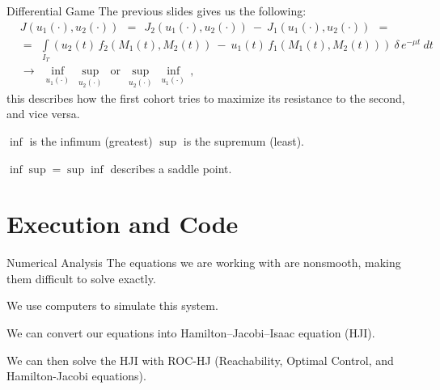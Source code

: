 \documentclass{beamer}
\begin{document}
\begin{frame}{Differential Game}
    The previous slides gives us the following:
    $$
    \begin{aligned}
    & J(u_1(\cdot), u_2(\cdot)) \:\: = \:\: J_2(u_1(\cdot), u_2(\cdot)) \: - \: J_1(u_1(\cdot), u_2(\cdot)) \:\: = \\
    & = \:\: \int\limits_{I_T} (u_2(t) \, f_2(M_1(t), M_2(t)) \: - \: u_1(t) \, f_1(M_1(t), M_2(t))) \: \delta \, e^{-\mu t} \: dt \:\:
    \\& \longrightarrow \:\: \inf_{u_1(\cdot)} \: \sup_{u_2(\cdot)} \:\: \mbox{or} \:\:
    \sup_{u_2(\cdot)} \: \inf_{u_1(\cdot)} \, ,
    \end{aligned}
    $$ 
    this describes how the first cohort tries to maximize its resistance to the second, and vice versa.\newline
    
    $\inf$ is the infimum (greatest) $\sup$ is the supremum (least).\newline
    
    $\inf\sup=\sup\inf$ describes a saddle point.
    
\end{frame}

\section{Execution and Code}
\begin{frame}{Numerical Analysis}
    The equations we are working with are nonsmooth, making them difficult to solve exactly. \newline

    We use computers to simulate this system. \newline
    
    We can convert our equations into Hamilton--Jacobi--Isaac equation (HJI). \newline
    
    We can then solve the HJI with ROC-HJ (Reachability, Optimal Control, and Hamilton-Jacobi equations).
\end{frame}
\end{document}
